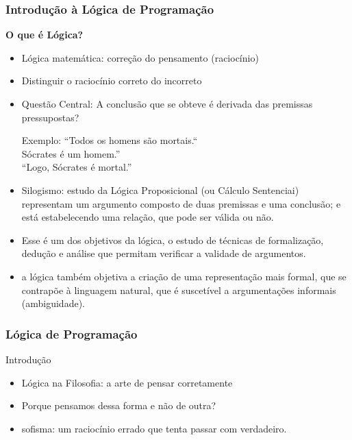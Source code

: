 \begin{frame}
	\frametitle{Introdução à Lógica de Programação}
	\textbf{O que é Lógica?}
	\begin{itemize}
		\item Lógica matemática: correção do pensamento (raciocínio)
		\item Distinguir o raciocínio correto do incorreto
		\item Questão Central: A conclusão que se obteve é derivada das premissas pressupostas?
		
		Exemplo: ``Todos os homens são mortais.``\\Sócrates é um homem.''\\``Logo, Sócrates é mortal.''
		
		\item Silogismo: estudo da Lógica Proposicional (ou Cálculo Sentenciai) representam um argumento composto de duas premissas e uma conclusão; e está estabelecendo uma relação, que pode ser válida ou não.
		
		\item Esse é um dos objetivos da lógica, o estudo de técnicas de formalização, dedução e análise que permitam verificar a validade de argumentos. 
		
		\item a lógica também objetiva a criação de uma representação mais formal, que se contrapõe à linguagem natural, que é suscetível a argumentações informais (ambiguidade).
	\end{itemize}
\end{frame}




\begin{frame}
	\frametitle{Lógica de Programação}
	Introdução
	\begin{itemize}
		\item Lógica na Filosofia: a arte de pensar corretamente
		\item Porque pensamos dessa forma e não de outra?
		\item sofisma: um raciocínio errado que tenta passar com verdadeiro.
	\end{itemize}
\end{frame}




